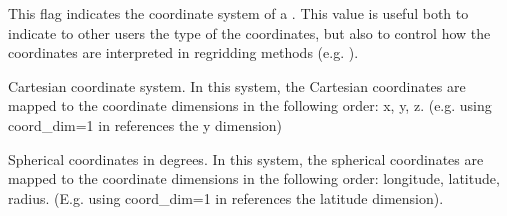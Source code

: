 \documentclass[letterpaper,10pt,english]{sphinxmanual}
\begin{document}
\begin{fulllineitems}
\label{\detokenize{CoordSys:ESMF.api.constants.CoordSys}}
This flag indicates the coordinate system of a {\hyperref[\detokenize{grid:ESMF.api.grid.Grid}]{}}. This value is
useful both to indicate to other users the type of the coordinates,
but also to control how the coordinates are interpreted in
regridding methods (e.g. {\hyperref[\detokenize{regrid:ESMF.api.regrid.Regrid}]{}}).

\begin{fulllineitems}
\label{\detokenize{CoordSys:ESMF.api.constants.CoordSys.CART}}
Cartesian coordinate system. In this system, the Cartesian
coordinates are mapped to the {\hyperref[\detokenize{grid:ESMF.api.grid.Grid}]{}} coordinate dimensions in the
following order: x, y, z. (e.g. using coord\_dim=1 in
{\hyperref[\detokenize{grid:ESMF.api.grid.Grid.get_coords}]{}} references the y dimension)

\end{fulllineitems}


\begin{fulllineitems}
\label{\detokenize{CoordSys:ESMF.api.constants.CoordSys.SPH_DEG}}
Spherical coordinates in degrees. In this system, the spherical
coordinates are mapped to the {\hyperref[\detokenize{grid:ESMF.api.grid.Grid}]{}} coordinate dimensions in the
following order: longitude, latitude, radius. (E.g. using
coord\_dim=1 in  references the latitude dimension).


\end{fulllineitems}
\end{fulllineitems}
\end{document}
